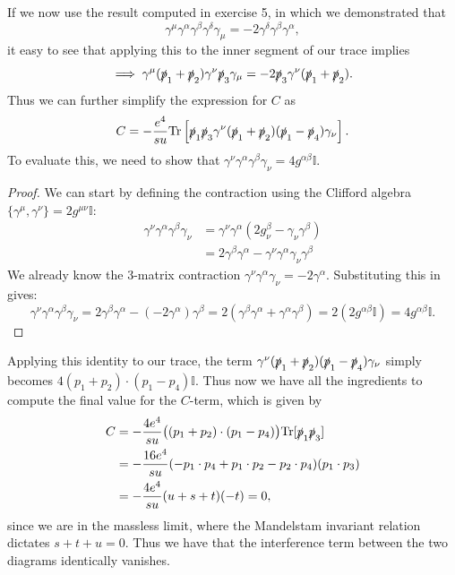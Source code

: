 If we now use the result computed in exercise 5, in which we demonstrated that
\[
    \gamma^{\mu} \gamma^{\alpha} \gamma^{\beta} \gamma^{\delta} \gamma_{\mu} = - 2 \gamma^{\delta} \gamma^{\beta} \gamma^{\alpha},
\]
it easy to see that applying this to the inner segment of our trace implies
\[
    \implies \gamma^\mu (\slashed{p}_1 + \slashed{p}_2) \gamma^\nu \slashed{p}_3 \gamma_\mu = -2 \slashed{p}_3 \gamma^\nu (\slashed{p}_1 + \slashed{p}_2).
\]
Thus we can further simplify the expression for \(C\) as
\[
    C = - \frac{e^4}{s u} \text{Tr}\left[ \slashed{p}_1 \slashed{p}_3 \gamma^\nu (\slashed{p}_1 + \slashed{p}_2) (\slashed{p}_1 - \slashed{p}_4) \gamma_\nu \right].
\]
To evaluate this, we need to show that \(\gamma^{\nu} \gamma^{\alpha} \gamma^{\beta} \gamma_{\nu} = 4 g^{\alpha \beta} \mathbb{I}\).
\begin{proof}
    We can start by defining the contraction using the Clifford algebra $\{ \gamma^\mu, \gamma^\nu \} = 2g^{\mu\nu}\mathbb{I}$:
    \[
        \begin{aligned}
            \gamma^\nu \gamma^\alpha \gamma^\beta \gamma_\nu & = \gamma^\nu \gamma^\alpha (2g^\beta_\nu - \gamma_\nu \gamma^\beta)              \\
                                                             & = 2\gamma^\beta \gamma^\alpha - \gamma^\nu \gamma^\alpha \gamma_\nu \gamma^\beta
        \end{aligned}
    \]
    We already know the 3-matrix contraction $\gamma^\nu \gamma^\alpha \gamma_\nu = -2\gamma^\alpha$. Substituting this in gives:
    \[
        \gamma^\nu \gamma^\alpha \gamma^\beta \gamma_\nu = 2\gamma^\beta \gamma^\alpha - (-2\gamma^\alpha)\gamma^\beta = 2(\gamma^\beta \gamma^\alpha + \gamma^\alpha \gamma^\beta) = 2(2g^{\alpha\beta}\mathbb{I}) = 4g^{\alpha\beta}\mathbb{I}.
    \]
\end{proof}

Applying this identity to our trace, the term $\gamma^\nu (\slashed{p}_1 + \slashed{p}_2) (\slashed{p}_1 - \slashed{p}_4) \gamma_\nu$ simply becomes $4 (p_1 + p_2) \cdot (p_1 - p_4) \mathbb{I}$.
Thus now we have all the ingredients to compute the final value for the \(C\)-term, which is given by
\[
    \begin{aligned}
        C & = - \frac{4 e^4}{su} \big( (p_1 + p_2) \cdot (p_1 - p_4) \big) \text{Tr}[\slashed{p}_1 \slashed{p}_3] \\
          & = - \frac{16 e^4}{su} (-p_1 \cdot p_4 + p_1 \cdot p_2 - p_2 \cdot p_4) (p_1 \cdot p_3)                \\
          & = - \frac{4 e^4}{su} (u + s + t) (-t) = 0,
    \end{aligned}
\]
since we are in the massless limit, where the Mandelstam invariant relation dictates \(s + t + u = 0\). Thus we have that the interference term between the two diagrams identically vanishes.

